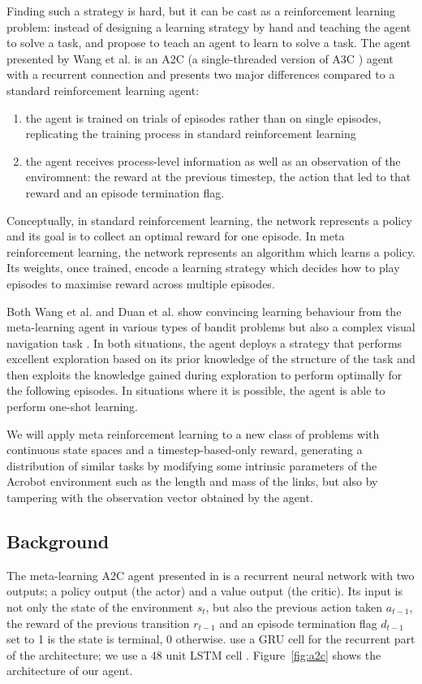 \documentclass[letterpaper]{article}
\begin{document}
Finding such a strategy is hard, but it can be cast as a reinforcement
learning problem: instead of designing a learning strategy by hand and
teaching the agent to solve a task, \cite{learningtorl}
and \cite{fastrlviaslowrl} propose to
teach an agent to learn to solve a task. The agent presented by Wang et al. is 
an A2C (a single-threaded version of A3C \citep{a3c})
agent with a recurrent connection and presents
two major differences compared to a standard reinforcement learning agent: 
\begin{enumerate}
	\item the agent is trained on trials of episodes rather than on single
		episodes, replicating the training process in standard 
		reinforcement learning
	\item the agent receives process-level information as well as
		an observation of the enviromnent: the reward at the previous
		timestep, the action that led to that reward and an 
		episode termination flag.
\end{enumerate}

Conceptually, in standard reinforcement learning, the network represents 
a policy and its goal is to collect an optimal reward for one episode. In
meta reinforcement learning, the network represents an algorithm which
learns a policy. Its weights, once trained, encode a learning strategy which
decides how to play episodes to maximise reward across multiple episodes.

Both Wang et al. and Duan et al. show convincing learning behaviour from
the meta-learning agent in various types of bandit problems but also
a complex visual navigation task \citep{learningtonavigate}. In both situations, 
the agent deploys a strategy that performs excellent exploration based on its 
prior knowledge of the structure of the task 
and then exploits the knowledge gained during exploration to perform 
optimally for the following episodes. In situations where it is possible, the
agent is able to perform one-shot learning.

We will apply meta reinforcement learning to a new class of problems with
continuous state spaces and a timestep-based-only reward, generating 
a distribution of similar tasks by modifying some intrinsic parameters
of the Acrobot environment such as the length and mass of the links, but also
by tampering with the observation vector obtained by the agent.

\subsection{Background} 
The meta-learning A2C agent presented in \cite{learningtorl} is a recurrent
neural network with two outputs; a policy output (the actor) and a value
output (the critic). Its input is not only the state of the environment $s_t$,
but also the previous action taken $a_{t-1}$, the reward of the previous
transition $r_{t-1}$ and an episode termination flag $d_{t-1}$ set to 1 is the
state is terminal, 0 otherwise. \cite{learningtorl} use a GRU \citep{grus} cell
for the recurrent part of the architecture; we use a 48 unit LSTM cell 
\citep{lstm}. Figure~\ref{fig:a2c} shows the architecture of our agent.
\end{document}
